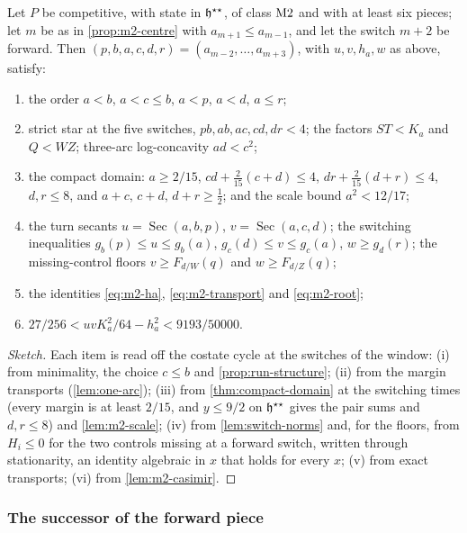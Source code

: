 \begin{proposition}\label{prop:m2-window}
Let $P$ be competitive, with state in $\mathfrak{h}^{\star\star}$, of class $\mathrm{M2}$ and with at least six pieces;
let $m$ be as in \cref{prop:m2-centre} with $a_{m+1}\le a_{m-1}$, and let the switch $m+2$ be
forward. Then $(p,b,a,c,d,r)=(a_{m-2},\dots,a_{m+3})$, with $u,v,h_a,w$ as above, satisfy:
\begin{enumerate}[label=(\roman*)]
\item the order $a<b$, $a<c\le b$, $a<p$, $a<d$, $a\le r$;
\item strict star at the five switches, $pb,ab,ac,cd,dr<4$; the factors $ST<K_a$ and $Q<WZ$;
three-arc log-concavity $ad<c^2$;
\item the compact domain: $a\ge2/15$, $cd+\frac2{15}(c+d)\le4$, $dr+\frac2{15}(d+r)\le4$,
$d,r\le8$, and $a+c,\,c+d,\,d+r\ge\frac12$; and the scale bound $a^2<12/17$;
\item the turn secants $u=\operatorname{Sec}(a,b,p)$, $v=\operatorname{Sec}(a,c,d)$; the switching
inequalities $g_b(p)\le u\le g_b(a)$, $g_c(d)\le v\le g_c(a)$, $w\ge g_d(r)$; the missing-control
floors $v\ge F_{d/W}(q)$ and $w\ge F_{d/Z}(q)$;
\item the identities \eqref{eq:m2-ha}, \eqref{eq:m2-transport} and \eqref{eq:m2-root};
\item $27/256<uvK_a^2/64-h_a^2<9193/50000$.
\end{enumerate}
\end{proposition}

\begin{proof}[Sketch]
Each item is read off the costate cycle at the switches of the window: (i) from minimality, the
choice $c\le b$ and \cref{prop:run-structure}; (ii) from the margin transports (\cref{lem:one-arc});
(iii) from \cref{thm:compact-domain} at the switching times (every margin is at least $2/15$, and
$y\le9/2$ on $\mathfrak{h}^{\star\star}$ gives the pair sums and $d,r\le8$) and \cref{lem:m2-scale}; (iv) from
\cref{lem:switch-norms} and, for the floors, from $H_i\le0$ for the two controls missing at a forward
switch, written through stationarity, an identity algebraic in
$x$ that holds for every $x$; (v) from exact transports; (vi) from \cref{lem:m2-casimir}.
\end{proof}

\subsubsection{The successor of the forward piece}\label{sec:m2-continuation}

